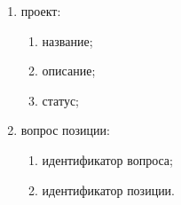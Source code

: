 \begin{enumerate}
\begin{enumerate}
    \end{enumerate}
  \item проект:
    \begin{enumerate}
      \item название;
      \item описание;
      \item статус;
    \end{enumerate}
  \pagebreak
  \item вопрос позиции:
    \begin{enumerate}
      \item идентификатор вопроса;
      \item идентификатор позиции.
    \end{enumerate}
\end{enumerate}
